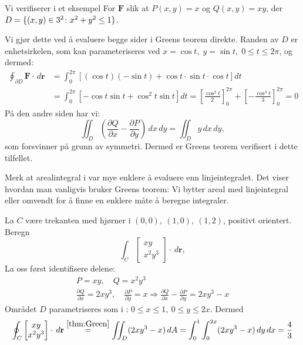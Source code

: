 \begin{eks}{Vi verifiserer   i et eksempel} \label{ex:greenveri}
For \( \mathbf{F}\) slik at \(P(x, y) = x \) og \( Q(x, y) = xy \), der \( D = \{(x,y) \in 3^2 \colon x^2 + y^2 \leq 1 \} \).

Vi gjør dette ved å evaluere begge sider i Greens teorem direkte. Randen av \( D \) er enhetsirkelen, som kan parameteriseres ved  
\( x = \cos t, \; y = \sin t, \; 0 \leq t \leq 2\pi \), og dermed:
\begin{align*}
\oint_{\partial D} \mathbf{F}\cdot\, d\mathbf{r} &=
\int_0^{2\pi} \left[(\cos t)(-\sin t) + \cos t \cdot \sin t \cdot \cos t\right] dt
\\ &= \int_0^{2\pi} \left[ -\cos t \sin t + \cos^2 t \sin t \right] dt
= \left[ \frac{\cos^2 t}{2} \right]_0^{2\pi} + \left[ -\frac{\cos^3 t}{3} \right]_0^{2\pi} = 0
\end{align*}
På den andre siden har vi:
\[
\iint_D \left( \frac{\partial Q}{\partial x} - \frac{\partial P}{\partial y} \right) \, dx\,dy
= \iint_D y \, dx\,dy,
\]
som forsvinner på grunn av symmetri. Dermed er Greens teorem verifisert i dette tilfellet.
\end{eks}
%
\begin{rem}{}
 Merk at arealintegral i  var mye enklere å evaluere enn linjeintegralet. Det viser hvordan man vanligvis bruker Greens teorem: Vi bytter areal med linjeintegral eller omvendt for å finne en enklere måte å beregne integraler.
\end{rem}
%
\begin{eks}{}
La \( C \) være trekanten med hjørner i \( (0,0),\ (1,0),\ (1,2) \), positivt orientert. Beregn
\[
\int_C \begin{bmatrix} xy\\ x^2 y^3\end{bmatrix} \cdot \, d\mathbf{r},
\]
La oss først identifisere delene:
\begin{align*}
P = xy, \quad Q = x^2 y^3
\\
\frac{\partial Q}{\partial x} = 2x y^3, \quad \frac{\partial P}{\partial y} = x
\Rightarrow \frac{\partial Q}{\partial x} - \frac{\partial P}{\partial y} = 2x y^3 - x
\end{align*}
Området $D$ parametriseres som i : \( 0 \leq x \leq 1,\ 0 \leq y \leq 2x \). 
Dermed 
\[
\oint_C \begin{bmatrix} xy\\ x^2 y^3\end{bmatrix} \cdot \, d\mathbf{r} \stackrel{\Cref{thm:Green}}{=} \iint_D (2x y^3 - x)\, dA = \int_0^1 \int_0^{2x} (2x y^3 - x)\, dy\, dx = \frac{4}{3}
\]
\end{eks}
\newpage

